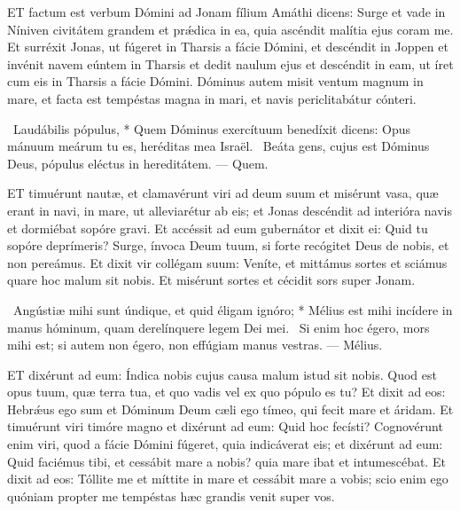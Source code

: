


\lettrine[lines=2]{E}{T} factum est verbum Dómini ad Jonam fílium Amáthi dicens: Surge et vade in Níniven civitátem grandem et prǽdica in ea, quia ascéndit malítia ejus coram me. Et surréxit Jonas, ut fúgeret in Tharsis a fácie Dómini, et descéndit in Joppen et invénit navem eúntem in Tharsis et dedit naulum ejus et descéndit in eam, ut íret cum eis in Tharsis a fácie Dómini. Dóminus autem misit ventum magnum in mare, et facta est tempéstas magna in mari, et navis periclitabátur cónteri.

\R\ Laudábilis pópulus, * Quem Dóminus exercítuum benedíxit dicens: Opus mánuum meárum tu es, heréditas mea Israël. \V\ Beáta gens, cujus est Dóminus Deus, pópulus eléctus in hereditátem. — Quem.


\lettrine[lines=2]{E}{T} timuérunt nautæ, et clamavérunt viri ad deum suum et misérunt vasa, quæ erant in navi, in mare, ut alleviarétur ab eis; et Jonas descéndit ad interióra navis et dormiébat sopóre gravi. Et accéssit ad eum gubernátor et dixit ei: Quid tu sopóre deprímeris? Surge, ínvoca Deum tuum, si forte recógitet Deus de nobis, et non pereámus. Et dixit vir collégam suum: Veníte, et mittámus sortes et sciámus quare hoc malum sit nobis. Et misérunt sortes et cécidit sors super Jonam.

\R\ Angústiæ mihi sunt úndique, et quid éligam ignóro; * Mélius est mihi incídere in manus hóminum, quam derelínquere legem Dei mei. \V\ Si enim hoc égero, mors mihi est; si autem non égero, non effúgiam manus vestras. — Mélius.



\lettrine[lines=2]{E}{T} dixérunt ad eum: Índica nobis cujus causa malum istud sit nobis. Quod est opus tuum, quæ terra tua, et quo vadis vel ex quo pópulo es tu? Et dixit ad eos: Hebrǽus ego sum et Dóminum Deum cæli ego tímeo, qui fecit mare et áridam. Et timuérunt viri timóre magno et dixérunt ad eum: Quid hoc fecísti? Cognovérunt enim viri, quod a fácie Dómini fúgeret, quia indicáverat eis; et dixérunt ad eum: Quid faciémus tibi, et cessábit mare a nobis? quia mare ibat et intumescébat. Et dixit ad eos: Tóllite me et míttite in mare et cessábit mare a vobis; scio enim ego quóniam propter me tempéstas hæc grandis venit super vos.

